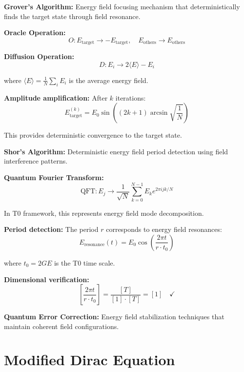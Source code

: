 \documentclass[12pt,a4paper]{report}
\begin{document}
\textbf{Grover's Algorithm:}
Energy field focusing mechanism that deterministically finds the target state through field resonance.

\textbf{Oracle Operation:}
\begin{equation}
	O: E_{\text{target}} \rightarrow -E_{\text{target}}, \quad E_{\text{others}} \rightarrow E_{\text{others}}
\end{equation}

\textbf{Diffusion Operation:}
\begin{equation}
	D: E_i \rightarrow 2\langle E \rangle - E_i
\end{equation}

where $\langle E \rangle = \frac{1}{N}\sum_i E_i$ is the average energy field.

\textbf{Amplitude amplification:}
After $k$ iterations:
\begin{equation}
	E_{\text{target}}^{(k)} = E_0 \sin\left((2k+1)\arcsin\sqrt{\frac{1}{N}}\right)
\end{equation}

This provides deterministic convergence to the target state.

\textbf{Shor's Algorithm:}
Deterministic energy field period detection using field interference patterns.

\textbf{Quantum Fourier Transform:}
\begin{equation}
	\text{QFT}: E_j \rightarrow \frac{1}{\sqrt{N}} \sum_{k=0}^{N-1} E_k e^{2\pi i jk/N}
\end{equation}

In T0 framework, this represents energy field mode decomposition.

\textbf{Period detection:}
The period $r$ corresponds to energy field resonances:
\begin{equation}
	E_{\text{resonance}}(t) = E_0 \cos\left(\frac{2\pi t}{r \cdot t_0}\right)
\end{equation}

where $t_0 = 2GE$ is the T0 time scale.

\textbf{Dimensional verification:}
\begin{equation}
	\left[\frac{2\pi t}{r \cdot t_0}\right] = \frac{[T]}{[1] \cdot [T]} = [1] \quad \checkmark
\end{equation}

\textbf{Quantum Error Correction:}
Energy field stabilization techniques that maintain coherent field configurations.

\section{Modified Dirac Equation}
\label{sec:modified_dirac}
\end{document}
